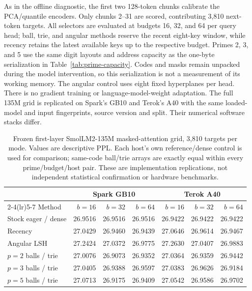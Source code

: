 \documentclass[11pt]{article}
\begin{document}
As in the offline diagnostic, the first two 128-token chunks calibrate the
PCA/quantile encoders. Only chunks 2--31 are scored, contributing 3,810
next-token targets. All selectors are evaluated at budgets 16, 32, and 64 per
query head; ball, trie, and angular methods reserve the recent eight-key window,
while recency retains the latest available keys up to the respective budget.
Primes 2, 3, and 5 use the same digit layouts and address capacity as the one-byte
serialization in Table~\ref{tab:prime-capacity}. Codes and masks remain unpacked
during the model intervention, so this serialization is not a measurement of
its working memory. The angular control uses eight fixed hyperplanes per head. There is no gradient training
or language-model-weight adaptation. The full 135M grid is replicated on
Spark's GB10 and Terok's A40 with the same loaded-model and input fingerprints,
source version and split. Their numerical software stacks differ.

\begin{table}[htbp]
\centering
\small
\caption{Frozen first-layer SmolLM2-135M masked-attention grid, 3,810 targets
per mode. Values are descriptive PPL. Each host's own reference/dense control
is used for comparison; same-code ball/trie arrays are exactly equal within
every prime/budget/host pair. These are implementation replications, not
independent statistical confirmation or hardware benchmarks.}
\begin{tabular}{lrrrrrr}
\toprule
 & \multicolumn{3}{c}{Spark GB10} & \multicolumn{3}{c}{Terok A40}\\
\cmidrule(lr){2-4}\cmidrule(lr){5-7}
Method & \(b=16\) & \(b=32\) & \(b=64\) & \(b=16\) & \(b=32\) & \(b=64\)\\
\midrule
Stock eager / dense & 26.9516 & 26.9516 & 26.9516 & 26.9422 & 26.9422 & 26.9422\\
Recency & 27.0429 & 26.9460 & 26.9439 & 27.0646 & 26.9614 & 26.9467\\
Angular LSH & 27.2424 & 27.0372 & 26.9775 & 27.2630 & 27.0407 & 26.9883\\
\(p=2\) balls / trie & 27.0076 & 26.9073 & 26.9352 & 27.0364 & 26.9359 & 26.9442\\
\(p=3\) balls / trie & 27.0405 & 26.9388 & 26.9597 & 27.0383 & 26.9626 & 26.9184\\
\(p=5\) balls / trie & 27.0713 & 26.9175 & 26.9409 & 27.0542 & 26.9586 & 26.9702\\
\bottomrule
\end{tabular}
\label{tab:p2-model}
\end{table}
\end{document}
